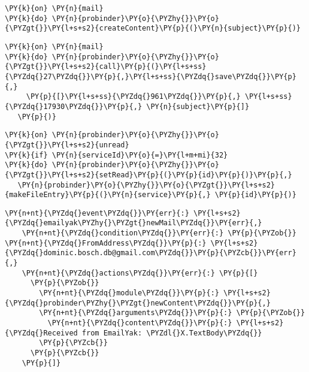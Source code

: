 \begin{Verbatim}[commandchars=\\\{\}]
\PY{k}{on} \PY{n}{mail}
\PY{k}{do} \PY{n}{probinder}\PY{o}{\PYZhy{}}\PY{o}{\PYZgt{}}\PY{l+s+s2}{createContent}\PY{p}{(}\PY{n}{subject}\PY{p}{)}
\end{Verbatim}


\begin{Verbatim}[commandchars=\\\{\}]
\PY{k}{on} \PY{n}{mail}
\PY{k}{do} \PY{n}{probinder}\PY{o}{\PYZhy{}}\PY{o}{\PYZgt{}}\PY{l+s+s2}{call}\PY{p}{(}\PY{l+s+ss}{\PYZdq{}27\PYZdq{}}\PY{p}{,}\PY{l+s+ss}{\PYZdq{}save\PYZdq{}}\PY{p}{,}
     \PY{p}{[}\PY{l+s+ss}{\PYZdq{}961\PYZdq{}}\PY{p}{,} \PY{l+s+ss}{\PYZdq{}17930\PYZdq{}}\PY{p}{,} \PY{n}{subject}\PY{p}{]}
   \PY{p}{)}
\end{Verbatim}


\begin{Verbatim}[commandchars=\\\{\}]
\PY{k}{on} \PY{n}{probinder}\PY{o}{\PYZhy{}}\PY{o}{\PYZgt{}}\PY{l+s+s2}{unread}
\PY{k}{if} \PY{n}{serviceId}\PY{o}{=}\PY{l+m+mi}{32}
\PY{k}{do} \PY{n}{probinder}\PY{o}{\PYZhy{}}\PY{o}{\PYZgt{}}\PY{l+s+s2}{setRead}\PY{p}{(}\PY{p}{id}\PY{p}{)}\PY{p}{,}
   \PY{n}{probinder}\PY{o}{\PYZhy{}}\PY{o}{\PYZgt{}}\PY{l+s+s2}{makeFileEntry}\PY{p}{(}\PY{n}{service}\PY{p}{,} \PY{p}{id}\PY{p}{)}
\end{Verbatim}

\newpage


\begin{Verbatim}[commandchars=\\\{\}]
    \PY{n+nt}{\PYZdq{}event\PYZdq{}}\PY{err}{:} \PY{l+s+s2}{\PYZdq{}emailyak\PYZhy{}\PYZgt{}newMail\PYZdq{}}\PY{err}{,}
    \PY{n+nt}{\PYZdq{}condition\PYZdq{}}\PY{err}{:} \PY{p}{\PYZob{}} \PY{n+nt}{\PYZdq{}FromAddress\PYZdq{}}\PY{p}{:} \PY{l+s+s2}{\PYZdq{}dominic.bosch.db@gmail.com\PYZdq{}}\PY{p}{\PYZcb{}}\PY{err}{,}
    \PY{n+nt}{\PYZdq{}actions\PYZdq{}}\PY{err}{:} \PY{p}{[}
      \PY{p}{\PYZob{}}
        \PY{n+nt}{\PYZdq{}module\PYZdq{}}\PY{p}{:} \PY{l+s+s2}{\PYZdq{}probinder\PYZhy{}\PYZgt{}newContent\PYZdq{}}\PY{p}{,}
        \PY{n+nt}{\PYZdq{}arguments\PYZdq{}}\PY{p}{:} \PY{p}{\PYZob{}}
          \PY{n+nt}{\PYZdq{}content\PYZdq{}}\PY{p}{:} \PY{l+s+s2}{\PYZdq{}Received from EmailYak: \PYZdl{}X.TextBody\PYZdq{}}
        \PY{p}{\PYZcb{}}
      \PY{p}{\PYZcb{}}
    \PY{p}{]}
\end{Verbatim}

